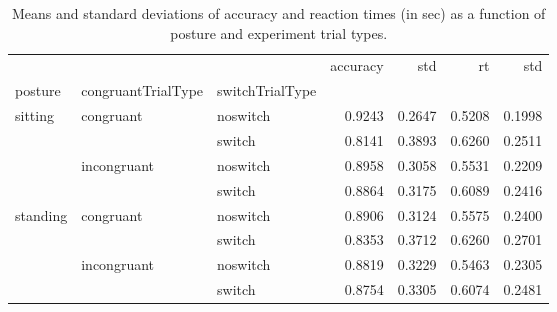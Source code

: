 \begin{table}
\centering
\caption{Means and standard deviations of accuracy and reaction times (in sec) as a function of posture and experiment trial types.}
\label{table-task-switching-replication-reaction-time}
\begin{tabular}{lllrrrr}
\toprule
         &             &        & accuracy &    std &     rt &    std \\
posture & congruantTrialType & switchTrialType &          &        &        &        \\
\midrule
sitting & congruant & noswitch &   0.9243 & 0.2647 & 0.5208 & 0.1998 \\
         &             & switch &   0.8141 & 0.3893 & 0.6260 & 0.2511 \\
         & incongruant & noswitch &   0.8958 & 0.3058 & 0.5531 & 0.2209 \\
         &             & switch &   0.8864 & 0.3175 & 0.6089 & 0.2416 \\
standing & congruant & noswitch &   0.8906 & 0.3124 & 0.5575 & 0.2400 \\
         &             & switch &   0.8353 & 0.3712 & 0.6260 & 0.2701 \\
         & incongruant & noswitch &   0.8819 & 0.3229 & 0.5463 & 0.2305 \\
         &             & switch &   0.8754 & 0.3305 & 0.6074 & 0.2481 \\
\bottomrule
\end{tabular}
\end{table}
